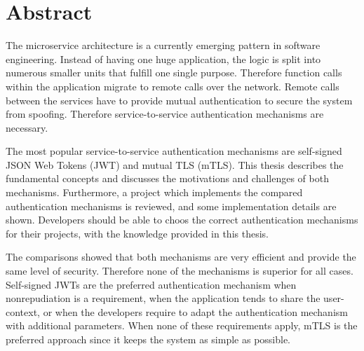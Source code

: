 \chapter{Abstract}
The microservice architecture is a currently emerging pattern in software engineering.
Instead of having one huge application, the logic is split into numerous smaller units that fulfill one single purpose.
Therefore function calls within the application migrate to remote calls over the network.
Remote calls between the services have to provide mutual authentication to secure the system from spoofing.
Therefore service-to-service authentication mechanisms are necessary. 

The most popular service-to-service authentication mechanisms are self-signed JSON Web Tokens (JWT) and mutual TLS (mTLS).
This thesis describes the fundamental concepts and discusses the motivations and challenges of both mechanisms.
Furthermore, a project which implements the compared authentication mechanisms is reviewed, and some implementation details are shown.
Developers should be able to choos the correct authentication mechanisms for their projects, with the knowledge provided in this thesis.

The comparisons showed that both mechanisms are very efficient and provide the same level of security.
Therefore none of the mechanisms is superior for all cases.
Self-signed JWTs are the preferred authentication mechanism when nonrepudiation is a requirement, when the application tends to share the user-context, or when the developers require to adapt the authentication mechanism with additional parameters.
When none of these requirements apply, mTLS is the preferred approach since it keeps the system as simple as possible.

